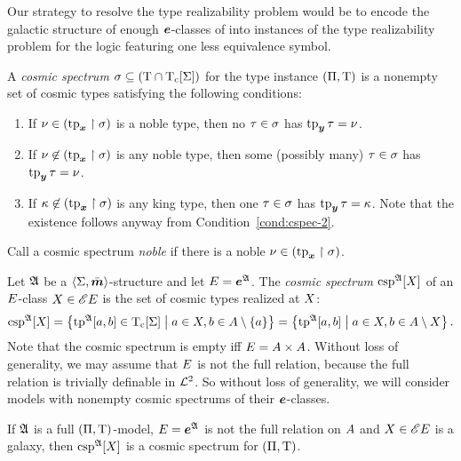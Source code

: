 Our strategy to resolve the type realizability problem would be to encode the
galactic structure of enough $\bm{e}$-classes of into instances of the type
realizability problem for the logic featuring one less equivalence symbol.
\begin{definition}
A \emph{cosmic spectrum} $\sigma \subseteq (\mathrm{T} \cap \mathrm{T}_{\mathrm{c}}[\mathrm{\Sigma}])$ for the
type instance $(\Pi,\mathrm{T})$ is a nonempty set of cosmic types satisfying
the following conditions:
\begin{enumerate}
  \item\label{cond:cspec-1} If $\nu \in (\operatorname{tp}_{\bm{x}}\restriction\sigma)$ is a noble
  type, then no $\tau \in \sigma$ has $\operatorname{tp}_{\bm{y}}\tau = \nu$.
  \item\label{cond:cspec-2} If $\nu \not\in (\operatorname{tp}_{\bm{x}}\restriction\sigma)$ is any
  noble type, then some (possibly many) $\tau \in \sigma$ has $\operatorname{tp}_{\bm{y}}\tau =
  \nu$.
  \item\label{cond:cspec-3} If $\kappa \not\in (\operatorname{tp}_{\bm{x}}\restriction\sigma)$ is any
  king type, then one $\tau \in \sigma$ has $\operatorname{tp}_{\bm{y}}\tau = \kappa$. Note that the existence follows
  anyway from Condition~\ref{cond:cspec-2}. 
\end{enumerate}
Call a cosmic spectrum \emph{noble} if there is a noble $\nu \in
(\operatorname{tp}_{\bm{x}}\restriction\sigma)$.
\end{definition}
\begin{definition}
Let $\mathfrak{A}$ be a $\left\langle \mathrm{\Sigma},\bar{\bm{m}} \right\rangle$-structure and let $E = \bm{e}^{\mathfrak{A}}$.
The \emph{cosmic spectrum} $\operatorname{csp}^{\mathfrak{A}}[X]$ of an $E$-class
$X \in {\mathscr{E}E}$ is the set of cosmic types realized at $X$:
\[
  \operatorname{csp}^{\mathfrak{A}}[X] = \left\{\operatorname{tp}^{\mathfrak{A}}[a,b] \in \mathrm{T}_{\mathrm{c}}[\mathrm{\Sigma}]\mathrel{}\middle|\mathrel{}a\in X, b 
  \in A\setminus\left\{a\right\}\right\} = \left\{\operatorname{tp}^{\mathfrak{A}}[a,b]\mathrel{}\middle|\mathrel{}a \in X, b \in
  A \setminus X\right\}.
\]
Note that the cosmic spectrum is empty iff $E = A\times A$.
Without loss of generality, we may assume that $E$ is not the full relation,
because the full relation is trivially definable in $\mathcal{L}^{2}$. So without loss of
generality, we will consider models with nonempty cosmic spectrums of their
$\bm{e}$-classes.
\end{definition}
\begin{remark}
If $\mathfrak{A}$ is a full $(\Pi,\mathrm{T})$-model, $E = \bm{e}^{\mathfrak{A}}$ is not the
full relation on $A$ and $X \in {\mathscr{E}E}$ is a galaxy, then
$\operatorname{csp}^{\mathfrak{A}}[X]$ is a cosmic spectrum for $(\Pi,\mathrm{T})$.
\end{remark}
